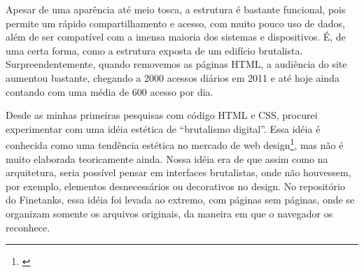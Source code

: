 Apesar de uma aparência até meio tosca, a estrutura é bastante funcional, pois permite um rápido compartilhamento e acesso, com muito pouco uso de dados, além de ser compatível com a imensa maioria dos sistemas e dispositivos. É, de uma certa forma, como a estrutura exposta de um edifício brutalista. Surpreendentemente, quando removemos as páginas HTML, a audiência do site aumentou bastante, chegando a 2000 acessos diários em 2011 e até hoje ainda contando com uma média de 600 acesso por dia. 

Desde as minhas primeiras pesquisas com código HTML e CSS, procurei experimentar com uma idéia estética de ``brutalismo digital''. Essa idéia é conhecida como uma tendência estética no mercado de web design\footnote{\cite{Hill2017}}, mas não é muito elaborada teoricamente ainda. Nossa idéia era de que assim como na arquitetura, seria possível pensar em interfaces brutalistas, onde não houvessem, por exemplo, elementos desnecessários ou decorativos no design. No repositório do Finetanks, essa idéia foi levada ao extremo, com páginas sem páginas, onde se organizam somente os arquivos originais, da maneira em que o navegador os reconhece.  


